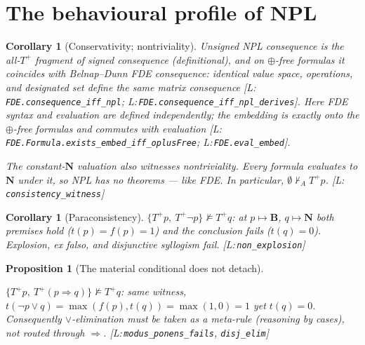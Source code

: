 \documentclass[11pt,a4paper]{article}
\newtheorem{proposition}[theorem]{Proposition}
\newtheorem{corollary}[theorem]{Corollary}
\theoremstyle{definition}
\newcommand{\vB}{\mathbf{B}}
\newcommand{\vN}{\mathbf{N}}
\newcommand{\hmz}{\oplus}                       %
\newcommand{\Tp}{T^{+}}\newcommand{\Tm}{T^{-}}
\newcommand{\dershort}{\vdash_{\!A}}
\newcommand{\lean}[1]{\texttt{#1}}
\begin{document}
\section{The behavioural profile of NPL}\label{sec:profile}

\begin{corollary}[Conservativity; nontriviality]\label{cor:conservative}
Unsigned NPL consequence is the all-$\Tp$ fragment of signed consequence
(definitional), and on $\hmz$-free formulas it coincides with Belnap--Dunn
FDE consequence: identical value space, operations, and designated set
define the same matrix consequence
[L:\,\lean{FDE.consequence\_iff\_npl};
L:\,\lean{FDE.consequence\_iff\_npl\_derives}].
Here FDE syntax and evaluation are defined independently; the embedding is exactly
onto the $\hmz$-free formulas and commutes with evaluation
[L:\,\lean{FDE.Formula.exists\_embed\_iff\_oplusFree};
L:\,\lean{FDE.eval\_embed}].

\smallskip
The constant-$\vN$ valuation also witnesses nontriviality.  Every formula
evaluates to $\vN$ under it, so NPL has no theorems --- like FDE.  In
particular, $\emptyset\not\dershort\Tp p$.
[L:\,\lean{consistency\_witness}]
\end{corollary}

\begin{corollary}[Paraconsistency]\label{cor:nonexplosion}
$\{\Tp p,\ \Tp\lnot p\}\not\models \Tp q$: at $p\mapsto\vB$, $q\mapsto\vN$
both premises hold ($t(p)=f(p)=1$) and the conclusion fails ($t(q)=0$).
Explosion, ex falso, and disjunctive syllogism fail.
[L:\,\lean{non\_explosion}]
\end{corollary}

\begin{proposition}[The material conditional does not detach]\label{prop:mp-fails}
\mbox{}\par\noindent
$\{\Tp p,\ \Tp(p\Rightarrow q)\}\not\models\Tp q$: same witness,
$t(\lnot p\vee q)=\max(f(p),t(q))=\max(1,0)=1$ yet $t(q)=0$. Consequently
$\vee$-elimination must be taken as a meta-rule (reasoning by cases), not
routed through $\Rightarrow$.
[L:\,\lean{modus\_ponens\_fails}, \lean{disj\_elim}]
\end{proposition}
\end{document}

